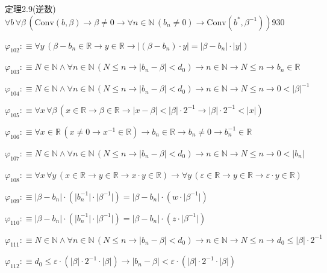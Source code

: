 \begin{fullproof}{定理2.9(逆数)}{$\forall b\,\forall \beta\,(\mathrm{Conv}(b,\beta) \to \beta \neq 0 \to \forall n \in \mathbb{N}\,(b_{n} \neq 0) \to \mathrm{Conv}(b^{\ast},\beta^{-1}))$}{930}
\begin{abbrevlist}
\item $\varphi_{102} :\equiv \forall y\,(\beta - b_{n} \in \mathbb{R} \to y \in \mathbb{R} \to \lvert (\beta - b_{n}) \cdot y \rvert = \lvert \beta - b_{n} \rvert \cdot \lvert y \rvert)$
\item $\varphi_{103} :\equiv N \in \mathbb{N} \land \forall n \in \mathbb{N}\,(N \leq n \to \lvert b_{n} - \beta \rvert < d_{0}) \to n \in \mathbb{N} \to N \leq n \to b_{n} \in \mathbb{R}$
\item $\varphi_{104} :\equiv N \in \mathbb{N} \land \forall n \in \mathbb{N}\,(N \leq n \to \lvert b_{n} - \beta \rvert < d_{0}) \to n \in \mathbb{N} \to N \leq n \to 0 < \lvert \beta \rvert^{-1}$
\item $\varphi_{105} :\equiv \forall x\,\forall \beta\,(x \in \mathbb{R} \to \beta \in \mathbb{R} \to \lvert x - \beta \rvert < \lvert \beta \rvert \cdot 2^{-1} \to \lvert \beta \rvert \cdot 2^{-1} < \lvert x \rvert)$
\item $\varphi_{106} :\equiv \forall x \in \mathbb{R}\,(x \neq 0 \to x^{-1} \in \mathbb{R}) \to b_{n} \in \mathbb{R} \to b_{n} \neq 0 \to b_{n}^{-1} \in \mathbb{R}$
\item $\varphi_{107} :\equiv N \in \mathbb{N} \land \forall n \in \mathbb{N}\,(N \leq n \to \lvert b_{n} - \beta \rvert < d_{0}) \to n \in \mathbb{N} \to N \leq n \to 0 < \lvert b_{n} \rvert$
\item $\varphi_{108} :\equiv \forall x\,\forall y\,(x \in \mathbb{R} \to y \in \mathbb{R} \to x \cdot y \in \mathbb{R}) \to \forall y\,(\varepsilon \in \mathbb{R} \to y \in \mathbb{R} \to \varepsilon \cdot y \in \mathbb{R})$
\item $\varphi_{109} :\equiv \lvert \beta - b_{n} \rvert \cdot (\lvert b_{n}^{-1} \rvert \cdot \lvert \beta^{-1} \rvert) = \lvert \beta - b_{n} \rvert \cdot (w \cdot \lvert \beta^{-1} \rvert)$
\item $\varphi_{110} :\equiv \lvert \beta - b_{n} \rvert \cdot (\lvert b_{n}^{-1} \rvert \cdot \lvert \beta^{-1} \rvert) = \lvert \beta - b_{n} \rvert \cdot (z \cdot \lvert \beta^{-1} \rvert)$
\item $\varphi_{111} :\equiv N \in \mathbb{N} \land \forall n \in \mathbb{N}\,(N \leq n \to \lvert b_{n} - \beta \rvert < d_{0}) \to n \in \mathbb{N} \to N \leq n \to d_{0} \leq \lvert \beta \rvert \cdot 2^{-1}$
\item $\varphi_{112} :\equiv d_{0} \leq \varepsilon \cdot (\lvert \beta \rvert \cdot 2^{-1} \cdot \lvert \beta \rvert) \to \lvert b_{n} - \beta \rvert < \varepsilon \cdot (\lvert \beta \rvert \cdot 2^{-1} \cdot \lvert \beta \rvert)$

\end{abbrevlist}
\end{fullproof}
